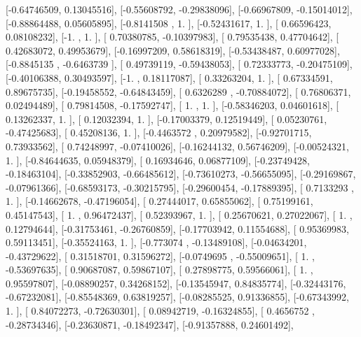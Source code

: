 \documentclass{article}
\begin{document}
       [-0.64746509,  0.13045516],
       [-0.55608792, -0.29838096],
       [-0.66967809, -0.15014012],
       [-0.88864488,  0.05605895],
       [-0.8141508 ,  1.        ],
       [-0.52431617,  1.        ],
       [ 0.66596423,  0.08108232],
       [-1.        ,  1.        ],
       [ 0.70380785, -0.10397983],
       [ 0.79535438,  0.47704642],
       [ 0.42683072,  0.49953679],
       [-0.16997209,  0.58618319],
       [-0.53438487,  0.60977028],
       [-0.8845135 , -0.6463739 ],
       [ 0.49739119, -0.59438053],
       [ 0.72333773, -0.20475109],
       [-0.40106388,  0.30493597],
       [-1.        ,  0.18117087],
       [ 0.33263204,  1.        ],
       [ 0.67334591,  0.89675735],
       [-0.19458552, -0.64843459],
       [ 0.6326289 , -0.70884072],
       [ 0.76806371,  0.02494489],
       [ 0.79814508, -0.17592747],
       [ 1.        ,  1.        ],
       [-0.58346203,  0.04601618],
       [ 0.13262337,  1.        ],
       [ 0.12032394,  1.        ],
       [-0.17003379,  0.12519449],
       [ 0.05230761, -0.47425683],
       [ 0.45208136,  1.        ],
       [-0.4463572 ,  0.20979582],
       [-0.92701715,  0.73933562],
       [ 0.74248997, -0.07410026],
       [-0.16244132,  0.56746209],
       [-0.00524321,  1.        ],
       [-0.84644635,  0.05948379],
       [ 0.16934646,  0.06877109],
       [-0.23749428, -0.18463104],
       [-0.33852903, -0.66485612],
       [-0.73610273, -0.56655095],
       [-0.29169867, -0.07961366],
       [-0.68593173, -0.30215795],
       [-0.29600454, -0.17889395],
       [ 0.7133293 ,  1.        ],
       [-0.14662678, -0.47196054],
       [ 0.27444017,  0.65855062],
       [ 0.75199161,  0.45147543],
       [ 1.        ,  0.96472437],
       [ 0.52393967,  1.        ],
       [ 0.25670621,  0.27022067],
       [ 1.        ,  0.12794644],
       [-0.31753461, -0.26760859],
       [-0.17703942,  0.11554688],
       [ 0.95369983,  0.59113451],
       [-0.35524163,  1.        ],
       [-0.773074  , -0.13489108],
       [-0.04634201, -0.43729622],
       [ 0.31518701,  0.31596272],
       [-0.0749695 , -0.55009651],
       [ 1.        , -0.53697635],
       [ 0.90687087,  0.59867107],
       [ 0.27898775,  0.59566061],
       [ 1.        ,  0.95597807],
       [-0.08890257,  0.34268152],
       [-0.13545947,  0.84835774],
       [-0.32443176, -0.67232081],
       [-0.85548369,  0.63819257],
       [-0.08285525,  0.91336855],
       [-0.67343992,  1.        ],
       [ 0.84072273, -0.72630301],
       [ 0.08942719, -0.16324855],
       [ 0.4656752 , -0.28734346],
       [-0.23630871, -0.18492347],
       [-0.91357888,  0.24601492],
\end{document}
